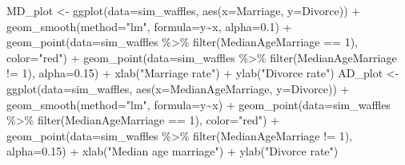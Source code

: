 \documentclass[
]{book}
\newenvironment{Shaded}{\begin{snugshade}}{\end{snugshade}}
\newcommand{\AttributeTok}[1]{\textcolor[rgb]{0.77,0.63,0.00}{#1}}
\newcommand{\DecValTok}[1]{\textcolor[rgb]{0.00,0.00,0.81}{#1}}
\newcommand{\FloatTok}[1]{\textcolor[rgb]{0.00,0.00,0.81}{#1}}
\newcommand{\FunctionTok}[1]{\textcolor[rgb]{0.00,0.00,0.00}{#1}}
\newcommand{\NormalTok}[1]{#1}
\newcommand{\OtherTok}[1]{\textcolor[rgb]{0.56,0.35,0.01}{#1}}
\newcommand{\SpecialCharTok}[1]{\textcolor[rgb]{0.00,0.00,0.00}{#1}}
\newcommand{\StringTok}[1]{\textcolor[rgb]{0.31,0.60,0.02}{#1}}
\begin{document}
\begin{Shaded}
\begin{Highlighting}[]
\NormalTok{MD\_plot }\OtherTok{\textless{}{-}} 
  \FunctionTok{ggplot}\NormalTok{(}\AttributeTok{data=}\NormalTok{sim\_waffles, }\FunctionTok{aes}\NormalTok{(}\AttributeTok{x=}\NormalTok{Marriage, }\AttributeTok{y=}\NormalTok{Divorce)) }\SpecialCharTok{+} 
    \FunctionTok{geom\_smooth}\NormalTok{(}\AttributeTok{method=}\StringTok{"lm"}\NormalTok{, }\AttributeTok{formula=}\NormalTok{y}\SpecialCharTok{\textasciitilde{}}\NormalTok{x, }\AttributeTok{alpha=}\FloatTok{0.1}\NormalTok{) }\SpecialCharTok{+} 
    \FunctionTok{geom\_point}\NormalTok{(}\AttributeTok{data=}\NormalTok{sim\_waffles }\SpecialCharTok{\%\textgreater{}\%} \FunctionTok{filter}\NormalTok{(MedianAgeMarriage }\SpecialCharTok{==} \DecValTok{1}\NormalTok{), }\AttributeTok{color=}\StringTok{"red"}\NormalTok{) }\SpecialCharTok{+}
    \FunctionTok{geom\_point}\NormalTok{(}\AttributeTok{data=}\NormalTok{sim\_waffles }\SpecialCharTok{\%\textgreater{}\%} \FunctionTok{filter}\NormalTok{(MedianAgeMarriage }\SpecialCharTok{!=} \DecValTok{1}\NormalTok{), }\AttributeTok{alpha=}\FloatTok{0.15}\NormalTok{) }\SpecialCharTok{+} 
    \FunctionTok{xlab}\NormalTok{(}\StringTok{"Marriage rate"}\NormalTok{) }\SpecialCharTok{+} 
    \FunctionTok{ylab}\NormalTok{(}\StringTok{"Divorce rate"}\NormalTok{) }
\NormalTok{AD\_plot }\OtherTok{\textless{}{-}} 
  \FunctionTok{ggplot}\NormalTok{(}\AttributeTok{data=}\NormalTok{sim\_waffles, }\FunctionTok{aes}\NormalTok{(}\AttributeTok{x=}\NormalTok{MedianAgeMarriage, }\AttributeTok{y=}\NormalTok{Divorce)) }\SpecialCharTok{+} 
    \FunctionTok{geom\_smooth}\NormalTok{(}\AttributeTok{method=}\StringTok{"lm"}\NormalTok{, }\AttributeTok{formula=}\NormalTok{y}\SpecialCharTok{\textasciitilde{}}\NormalTok{x) }\SpecialCharTok{+} 
    \FunctionTok{geom\_point}\NormalTok{(}\AttributeTok{data=}\NormalTok{sim\_waffles }\SpecialCharTok{\%\textgreater{}\%} \FunctionTok{filter}\NormalTok{(MedianAgeMarriage }\SpecialCharTok{==} \DecValTok{1}\NormalTok{), }\AttributeTok{color=}\StringTok{"red"}\NormalTok{) }\SpecialCharTok{+}
    \FunctionTok{geom\_point}\NormalTok{(}\AttributeTok{data=}\NormalTok{sim\_waffles }\SpecialCharTok{\%\textgreater{}\%} \FunctionTok{filter}\NormalTok{(MedianAgeMarriage }\SpecialCharTok{!=} \DecValTok{1}\NormalTok{), }\AttributeTok{alpha=}\FloatTok{0.15}\NormalTok{) }\SpecialCharTok{+} 
    \FunctionTok{xlab}\NormalTok{(}\StringTok{"Median age marriage"}\NormalTok{) }\SpecialCharTok{+} 
    \FunctionTok{ylab}\NormalTok{(}\StringTok{"Divorce rate"}\NormalTok{)}
  

\end{Highlighting}
\end{Shaded}
\end{document}
